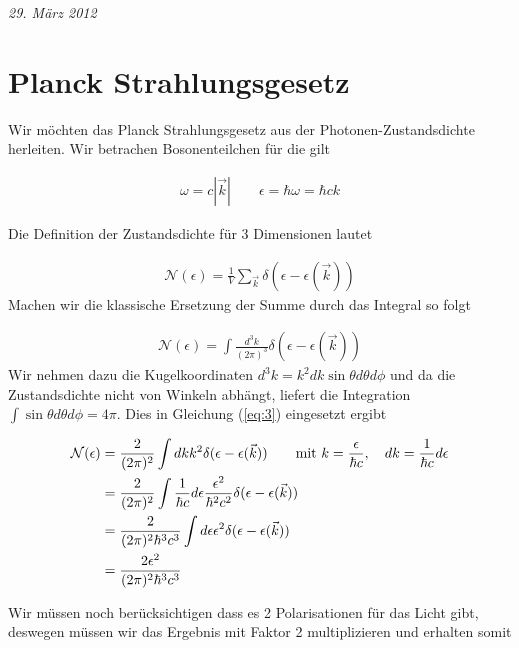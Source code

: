 
\usepackage{amsmath} 





\textit{29. März 2012}


\section*{Planck Strahlungsgesetz}

Wir möchten das Planck Strahlungsgesetz aus der Photonen-Zustandsdichte herleiten. Wir betrachen Bosonenteilchen  für die gilt

\begin{align}
  \label{eq:1}
  \omega = c |\vec k| \qquad \epsilon = \hbar \omega = \hbar c k
\end{align}

Die Definition der Zustandsdichte für 3 Dimensionen lautet

\begin{align}
  \label{eq:2}
  \mathcal N (\epsilon) = \frac{1}{V}\sum_{\vec k} \delta(\epsilon - \epsilon(\vec k))
\end{align}
Machen wir die klassische Ersetzung der Summe durch das Integral so folgt

\begin{align}
  \label{eq:3}
  \mathcal N (\epsilon) = \int \frac{d^3k}{(2\pi)^3} \delta(\epsilon - \epsilon(\vec k))
\end{align}
Wir nehmen dazu die Kugelkoordinaten \(d^3k = k^2dk \sin\theta d\theta d\phi\) und da die Zustandsdichte nicht von Winkeln abhängt, liefert die Integration \( \int \sin\theta d\theta d\phi=4\pi\). Dies in Gleichung (\ref{eq:3}) eingesetzt ergibt

\begin{align}
  \label{eq:4}
   \mathcal N (\epsilon) &= \frac{2}{(2\pi)^2}  \int dk k^2 \delta(\epsilon - \epsilon(\vec k)) \qquad \text{mit }k=\frac{\epsilon}{\hbar c},\quad dk = \frac{1}{\hbar c}d\epsilon \notag\\
 &= \frac{2}{(2\pi)^2}  \int \frac{1}{\hbar c}d\epsilon \frac{\epsilon^2}{\hbar^2 c^2} \delta(\epsilon - \epsilon(\vec k)) \notag\\
&= \frac{2}{(2\pi)^2 \hbar^3 c^3}  \int d\epsilon \epsilon^2 \delta(\epsilon - \epsilon(\vec k)) \notag\\
&= \frac{2 \epsilon^2}{(2\pi)^2 \hbar^3 c^3} 
\end{align}

Wir müssen noch berücksichtigen dass es 2 Polarisationen für das Licht gibt, deswegen müssen wir das Ergebnis mit Faktor 2 multiplizieren und erhalten somit

